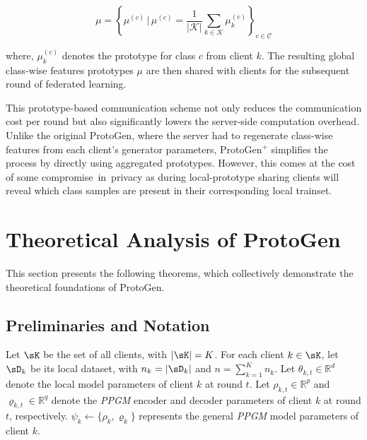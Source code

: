\documentclass[lettersize,journal]{IEEEtran}
\begin{document}
\begin{equation}
\label{eq:global_proto_plus}
\mu = \left\{\mu^{(c)} \,\big|\, \mu^{(c)} = \frac{1}{|\mathcal{K}|} \sum_{k \in \mathcal{K}} \mu_k^{(c)} \right\}_{c \in \mathcal{C}}    
\end{equation}

where, $\mu_k^{(c)}$ denotes the prototype for class $c$ from client $k$. The resulting global class-wise features prototypes $\mu$ are then shared with clients for the subsequent round of federated learning.

This prototype-based communication scheme not only reduces the communication cost per round but also significantly lowers the server-side computation overhead. Unlike the original \textsf{ProtoGen}, where the server had to regenerate class-wise features from each client's generator parameters, \textsf{ProtoGen}$^+$ simplifies the process by directly using aggregated prototypes. However, this comes at the cost of  some compromise in privacy as during local-prototype sharing clients will reveal which class samples are present in their corresponding local trainset.


\section{Theoretical Analysis of \textsf{ProtoGen}}\label{sec-th}

This section presents the following theorems, which collectively demonstrate the theoretical foundations of \textsf{ProtoGen}.

\subsection{Preliminaries and Notation}

Let $\sK$ be the set of all clients, with $|\sK| = K$. For each client $k \in \sK$, let $\sD_k$ be its local dataset, with $n_k = |\sD_k|$ and $n = \sum_{k=1}^K n_k$. Let $\theta_{k,t} \in \mathbb{R}^d$ denote the local model parameters of client $k$ at round $t$. Let $\rho_{k,t} \in \mathbb{R}^p$ and $\varrho_{k,t} \in \mathbb{R}^q$ denote the \emph{PPGM} encoder and decoder parameters of client $k$ at round $t$, respectively. $\psi_k \leftarrow\{\rho_k,\varrho_k\}$ represents the general \emph{PPGM} model parameters of client $k$. 
\end{document}
